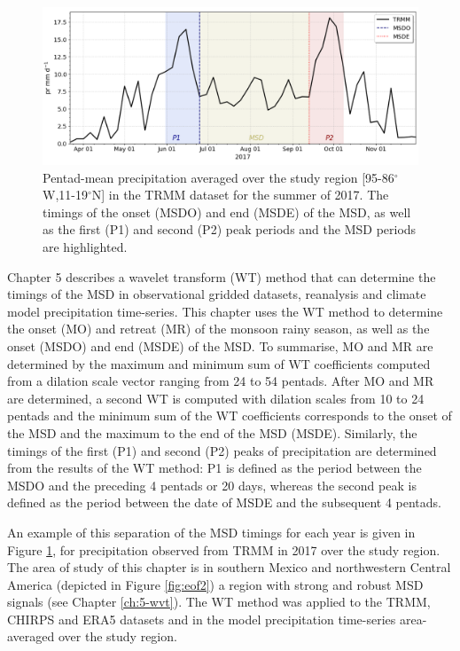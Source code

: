  \begin{figure}[t!]
\includegraphics[width=\linewidth]{figures/explain_fig_msd.png}
\caption[Illustration of the use of the wavelet transform method]{Pentad-mean precipitation averaged over the study region [95-86$^\circ$W,11-19$^\circ$N] in the TRMM dataset for the summer of 2017. The timings of the onset (MSDO) and end (MSDE) of the MSD, as well as the first (P1) and second (P2) peak periods and the MSD periods are highlighted. }
\label{fig:explain_msd}
\end{figure}

Chapter 5 describes a wavelet transform (WT) method that can determine the timings of the MSD in observational gridded datasets, reanalysis and climate model precipitation time-series. 
This chapter uses the WT method to determine the onset (MO) and retreat (MR) of the monsoon rainy season, as well as the onset  (MSDO) and end (MSDE) of the MSD. 
To summarise, MO and MR are determined by the maximum and minimum sum of WT coefficients computed from a dilation scale vector ranging from 24 to 54 pentads. After MO and MR are determined, a second WT is computed with dilation scales from 10 to 24 pentads and the minimum sum of the WT coefficients corresponds to the onset of the MSD and the maximum to the end of the MSD (MSDE). 
Similarly, the timings of the first (P1) and second (P2) peaks of precipitation are determined from the results of the WT method: P1 is defined as the period between the MSDO and the preceding 4 pentads or 20 days, whereas the second peak is defined as the period between the date of MSDE and the subsequent 4 pentads.

 An example of this separation of the MSD timings for each year is given in Figure \ref{fig:explain_msd}, for precipitation observed from TRMM in 2017 over the study region.
The area of study of this chapter is in southern Mexico and northwestern Central America (depicted in Figure \ref{fig:eof2}) a region with strong and robust MSD signals (see Chapter \ref{ch:5-wvt}). The WT method was applied to the TRMM, CHIRPS and ERA5 datasets and in the model precipitation time-series area-averaged over the study region. 

